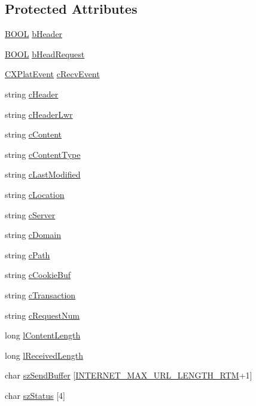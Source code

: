 \subsection*{\-Protected \-Attributes}
\begin{DoxyCompactItemize}
\item 
\hyperlink{_cpclient_8h_a3be13892ae7076009afcf121347dd319}{\-B\-O\-O\-L} \hyperlink{class_c_h_t_t_p_client_aa2db4dc9f1177eef59e79ff1970a4a06}{b\-Header}
\item 
\hyperlink{_cpclient_8h_a3be13892ae7076009afcf121347dd319}{\-B\-O\-O\-L} \hyperlink{class_c_h_t_t_p_client_a98a9f41337106c89ca4331d3ee067735}{b\-Head\-Request}
\item 
\hyperlink{class_c_x_plat_event}{\-C\-X\-Plat\-Event} \hyperlink{class_c_h_t_t_p_client_a1ac75d26c210602da43085a9ba1de5bb}{c\-Recv\-Event}
\item 
string \hyperlink{class_c_h_t_t_p_client_ab8d840e3a99e3092df067a218c25e621}{c\-Header}
\item 
string \hyperlink{class_c_h_t_t_p_client_a71cb458d2508e65189f0c65dba6d465d}{c\-Header\-Lwr}
\item 
string \hyperlink{class_c_h_t_t_p_client_a7c814dc76e1feb17be827cfa58246f5e}{c\-Content}
\item 
string \hyperlink{class_c_h_t_t_p_client_a2c8833f6431a9449a2ca776d3b75fdb9}{c\-Content\-Type}
\item 
string \hyperlink{class_c_h_t_t_p_client_a9913b3d73cb9a8172a8ca5e13d39088f}{c\-Last\-Modified}
\item 
string \hyperlink{class_c_h_t_t_p_client_a2d2289bf6605dbe853143fb523f81058}{c\-Location}
\item 
string \hyperlink{class_c_h_t_t_p_client_acbcb5dd8619fbba37910ca522a0bc1a4}{c\-Server}
\item 
string \hyperlink{class_c_h_t_t_p_client_ab9788ca9dcc416a443622abb3ce44b70}{c\-Domain}
\item 
string \hyperlink{class_c_h_t_t_p_client_a7f2cc6944a2535539772f62b51f0c568}{c\-Path}
\item 
string \hyperlink{class_c_h_t_t_p_client_aead239b82d8415a05884cafebf5a384a}{c\-Cookie\-Buf}
\item 
string \hyperlink{class_c_h_t_t_p_client_adbc5e3e3b321c3179b986f2ed2ff0eb1}{c\-Transaction}
\item 
string \hyperlink{class_c_h_t_t_p_client_aa4092d7fea50e76e30f3269479253db6}{c\-Request\-Num}
\item 
long \hyperlink{class_c_h_t_t_p_client_a3840ab9a7468b62900613238c47c36cb}{l\-Content\-Length}
\item 
long \hyperlink{class_c_h_t_t_p_client_a3912e2379d3a00b9a0e671abab1dd0b7}{l\-Received\-Length}
\item 
char \hyperlink{class_c_h_t_t_p_client_aff047143e60597632e37899b10fab8e2}{sz\-Send\-Buffer} \mbox{[}\hyperlink{rtminet_8h_aff8960325dbc7b5bf858b614b502da19}{\-I\-N\-T\-E\-R\-N\-E\-T\-\_\-\-M\-A\-X\-\_\-\-U\-R\-L\-\_\-\-L\-E\-N\-G\-T\-H\-\_\-\-R\-T\-M}+1\mbox{]}
\item 
char \hyperlink{class_c_h_t_t_p_client_a05468a0fa4fd07830d9dc0fd0fba55ee}{sz\-Status} \mbox{[}4\mbox{]}
\end{DoxyCompactItemize}


